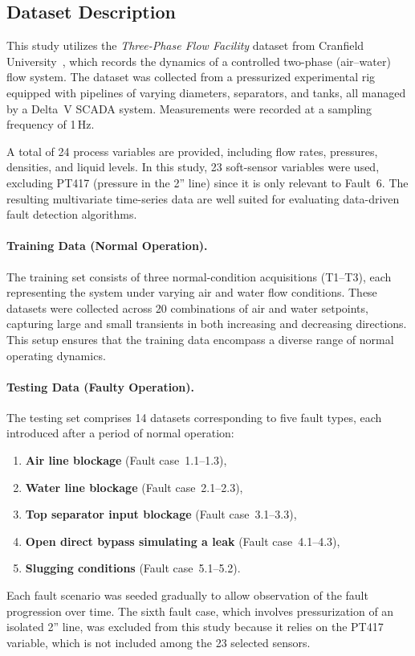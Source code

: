 \documentclass{article}
\begin{document}
\subsection{Dataset Description}\label{sec:dataset}

This study utilizes the \textit{Three-Phase Flow Facility} dataset from Cranfield University~\citep{cao_mba_lao_samuel_2015}, which records the dynamics of a controlled two-phase (air–water) flow system. The dataset was collected from a pressurized experimental rig equipped with pipelines of varying diameters, separators, and tanks, all managed by a Delta~V SCADA system. Measurements were recorded at a sampling frequency of 1\,Hz.

A total of 24 process variables are provided, including flow rates, pressures, densities, and liquid levels. In this study, 23 soft-sensor variables were used, excluding PT417 (pressure in the 2'' line) since it is only relevant to Fault~6. The resulting multivariate time-series data are well suited for evaluating data-driven fault detection algorithms.

\paragraph{Training Data (Normal Operation).}
The training set consists of three normal-condition acquisitions (T1–T3), each representing the system under varying air and water flow conditions. These datasets were collected across 20 combinations of air and water setpoints, capturing large and small transients in both increasing and decreasing directions. This setup ensures that the training data encompass a diverse range of normal operating dynamics.

\paragraph{Testing Data (Faulty Operation).}
The testing set comprises 14 datasets corresponding to five fault types, each introduced after a period of normal operation:
\begin{enumerate}
    \item \textbf{Air line blockage} (Fault case~1.1–1.3),
    \item \textbf{Water line blockage} (Fault case~2.1–2.3),
    \item \textbf{Top separator input blockage} (Fault case~3.1–3.3),
    \item \textbf{Open direct bypass simulating a leak} (Fault case~4.1–4.3),
    \item \textbf{Slugging conditions} (Fault case~5.1–5.2).
\end{enumerate}
Each fault scenario was seeded gradually to allow observation of the fault progression over time. The sixth fault case, which involves pressurization of an isolated 2'' line, was excluded from this study because it relies on the PT417 variable, which is not included among the 23 selected sensors.
\end{document}
